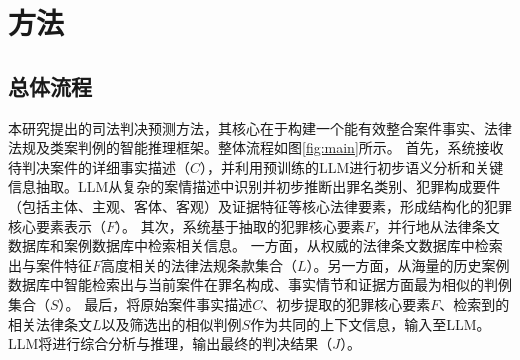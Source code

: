 

\section{\heiti 方法}
\subsection{\heiti 总体流程}


本研究提出的司法判决预测方法，其核心在于构建一个能有效整合案件事实、法律法规及类案判例的智能推理框架。整体流程如图\ref{fig:main}所示。
首先，系统接收待判决案件的详细事实描述（$C$），并利用预训练的LLM进行初步语义分析和关键信息抽取。LLM从复杂的案情描述中识别并初步推断出罪名类别、犯罪构成要件（包括主体、主观、客体、客观）及证据特征等核心法律要素，形成结构化的犯罪核心要素表示（$F$）。
其次，系统基于抽取的犯罪核心要素$F$，并行地从法律条文数据库和案例数据库中检索相关信息。
一方面，从权威的法律条文数据库中检索出与案件特征$F$高度相关的法律法规条款集合（$L$）。另一方面，从海量的历史案例数据库中智能检索出与当前案件在罪名构成、事实情节和证据方面最为相似的判例集合（$S$）。
最后，将原始案件事实描述$C$、初步提取的犯罪核心要素$F$、检索到的相关法律条文$L$以及筛选出的相似判例$S$作为共同的上下文信息，输入至LLM。LLM将进行综合分析与推理，输出最终的判决结果（$J$）。

